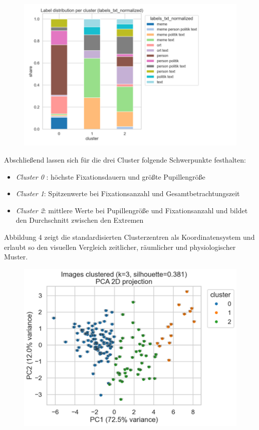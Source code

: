 \documentclass[
    language=german, %
    thesis=seminar, %
    supervisor=postdoc, %
    multiauthor=true, %
    ]{settings/csssa-thesis}
\begin{document}
 \begin{figure}[h]
    \centering
    \includegraphics[width=\linewidth,height=0.8\textheight,keepaspectratio]{figures/Abb 3.png}
    \caption{}
    \label{fig:cluster3}
\end{figure}

Abschlie{\ss}end lassen sich für die drei Cluster folgende Schwerpunkte festhalten:
\begin{itemize}
    \item \textit{Cluster 0} : höchste Fixationsdauern und grö{\ss}te Pupillengrö{\ss}e
    \item \textit{Cluster 1}: Spitzenwerte bei Fixationsanzahl und Gesamtbetrachtungszeit
    \item \textit{Cluster 2}: mittlere Werte bei Pupillengrö{\ss}e und Fixationsanzahl und bildet den Durchschnitt zwischen den Extremen
\end{itemize}

Abbildung 4 zeigt die standardisierten Clusterzentren als Koordinatensystem und erlaubt so den visuellen Vergleich zeitlicher, räumlicher und physiologischer Muster.

 \begin{figure}[h]
    \centering
    \includegraphics[width=\linewidth,height=0.8\textheight,keepaspectratio]{figures/Abb 4.png}
    \caption{}
    \label{fig:cluster4}
\end{figure}
\end{document}

